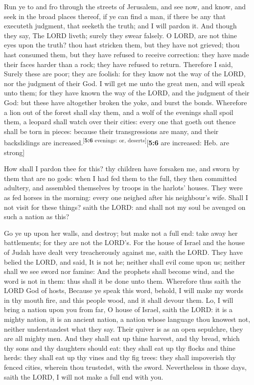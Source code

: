  Run ye to and fro through the streets of Jerusalem, and
see now, and know, and seek in the broad places thereof, if ye can find
a man, if there be any that executeth judgment, that seeketh the truth;
and I will pardon it.  And though they say, The LORD
liveth; surely they swear falsely.  O LORD, are not thine
eyes upon the truth? thou hast stricken them, but they have not grieved;
thou hast consumed them, but they have refused to receive correction:
they have made their faces harder than a rock; they have refused to
return.  Therefore I said, Surely these are poor; they are
foolish: for they know not the way of the LORD, nor the judgment of
their God.  I will get me unto the great men, and will
speak unto them; for they have known the way of the LORD, and the
judgment of their God: but these have altogether broken the yoke, and
burst the bonds.  Wherefore a lion out of the forest shall
slay them, and a wolf of the evenings shall spoil them, a leopard shall
watch over their cities: every one that goeth out thence shall be torn
in pieces: because their transgressions are many, and their backslidings
are increased.\textsuperscript{{[}\textbf{5:6} evenings: or,
deserts{]}}{[}\textbf{5:6} are increased: Heb. are strong{]}

 How shall I pardon thee for this? thy children have
forsaken me, and sworn by them that are no gods: when I had fed them to
the full, they then committed adultery, and assembled themselves by
troops in the harlots' houses.  They were as fed horses in
the morning: every one neighed after his neighbour's wife.
 Shall I not visit for these things? saith the LORD: and
shall not my soul be avenged on such a nation as this?

 Go ye up upon her walls, and destroy; but make not a
full end: take away her battlements; for they are not the LORD's.
 For the house of Israel and the house of Judah have
dealt very treacherously against me, saith the LORD. 
They have belied the LORD, and said, It is not he; neither shall evil
come upon us; neither shall we see sword nor famine:  And
the prophets shall become wind, and the word is not in them: thus shall
it be done unto them.  Wherefore thus saith the LORD God
of hosts, Because ye speak this word, behold, I will make my words in
thy mouth fire, and this people wood, and it shall devour them.
 Lo, I will bring a nation upon you from far, O house of
Israel, saith the LORD: it is a mighty nation, it is an ancient nation,
a nation whose language thou knowest not, neither understandest what
they say.  Their quiver is as an open sepulchre, they are
all mighty men.  And they shall eat up thine harvest, and
thy bread, which thy sons and thy daughters should eat: they shall eat
up thy flocks and thine herds: they shall eat up thy vines and thy fig
trees: they shall impoverish thy fenced cities, wherein thou trustedst,
with the sword.  Nevertheless in those days, saith the
LORD, I will not make a full end with you.

